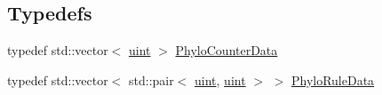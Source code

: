 \subsection*{Typedefs}
\begin{DoxyCompactItemize}
\item 
typedef std\+::vector$<$ \hyperlink{namespacebarry_a11dfc53ddb4672278319aa04f1e09a6c}{uint} $>$ \hyperlink{namespacebarry_1_1counters_1_1phylo_a6ecc0d8ab76f8dc2db152221a8e9e95a}{Phylo\+Counter\+Data}
\item 
typedef std\+::vector$<$ std\+::pair$<$ \hyperlink{namespacebarry_a11dfc53ddb4672278319aa04f1e09a6c}{uint}, \hyperlink{namespacebarry_a11dfc53ddb4672278319aa04f1e09a6c}{uint} $>$ $>$ \hyperlink{namespacebarry_1_1counters_1_1phylo_a5da540950bcf3372bcedb17a5b23667c}{Phylo\+Rule\+Data}
\end{DoxyCompactItemize}
